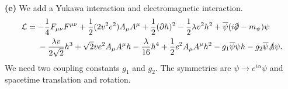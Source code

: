 \documentclass{article}
\makeatletter
\newcommand*{\shifttext}[1]{%
  \settowidth{\@tempdima}{#1}%
  \hspace{-\@tempdima}#1%
}
\newcommand{\plabel}[1]{%
\shifttext{\textbf{#1}\quad}%
}
\makeatother
\begin{document}
\plabel{(e)}%
We add a Yukawa interaction and electromagnetic interaction.
\begin{align*}
    \mathcal{L} &= -\frac{1}{4} F_{\mu\nu}F^{\mu\nu} + \frac{1}{2} (2 v^2e^2) A_\mu A^\mu + \frac{1}{2}(\partial h)^2  - \frac{1}{2}\lambda v^2 h^2 + \overline{\psi}(i\slashed{\partial}-m_\psi)\psi \\
    &\phantom{{}={}} - \frac{\lambda v}{2\sqrt{2}} h^3 + \sqrt{2}ve^2 A_\mu A^\mu h - \frac{\lambda}{16} h^4 + \frac{1}{2}e^2 A_\mu A^\mu h^2 - g_1 \overline{\psi}\psi h - g_2 \overline{\psi} \slashed{A} \psi.
\end{align*}
We need two coupling constants $g_1$ and $g_2$.
The symmetries are $\psi \rightarrow e^{i\alpha}\psi$ and spacetime translation and rotation.
\end{document}
